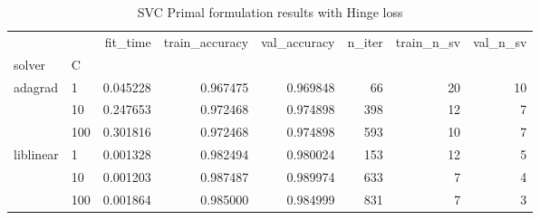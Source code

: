 \begin{table}[h!]
\centering
\caption{SVC Primal formulation results with Hinge loss}
\label{primal_svc_hinge_cv_results}
\begin{tabular}{llrrrrrr}
\toprule
          &     &  fit\_time &  train\_accuracy &  val\_accuracy &  n\_iter &  train\_n\_sv &  val\_n\_sv \\
solver & C &           &                 &               &         &             &           \\
\midrule
adagrad & 1   &  0.045228 &        0.967475 &      0.969848 &      66 &          20 &        10 \\
          & 10  &  0.247653 &        0.972468 &      0.974898 &     398 &          12 &         7 \\
          & 100 &  0.301816 &        0.972468 &      0.974898 &     593 &          10 &         7 \\
liblinear & 1   &  0.001328 &        0.982494 &      0.980024 &     153 &          12 &         5 \\
          & 10  &  0.001203 &        0.987487 &      0.989974 &     633 &           7 &         4 \\
          & 100 &  0.001864 &        0.985000 &      0.984999 &     831 &           7 &         3 \\
\bottomrule
\end{tabular}
\end{table}
